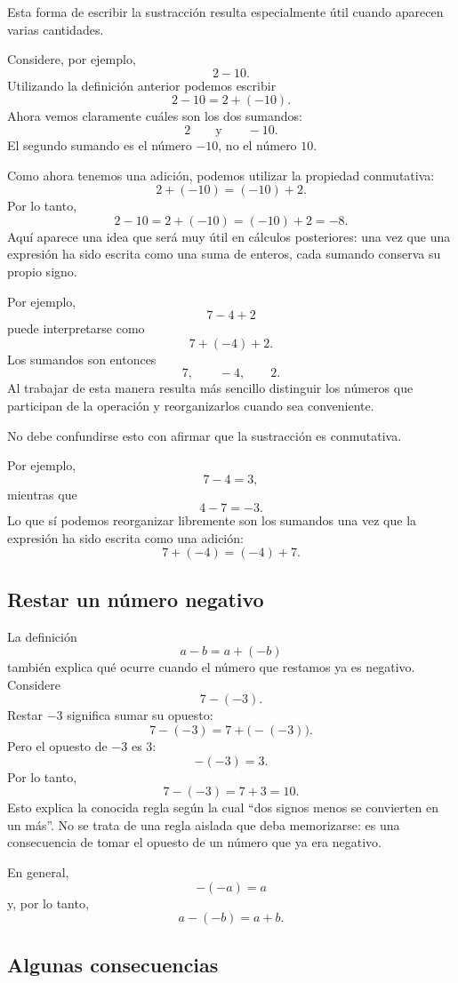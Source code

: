 Esta forma de escribir la sustracción resulta especialmente útil cuando aparecen varias cantidades.

Considere, por ejemplo,
\[
2-10.
\]
Utilizando la definición anterior podemos escribir
\[
2-10=2+(-10).
\]
Ahora vemos claramente cuáles son los dos sumandos:
\[
2
\qquad\text{y}\qquad
-10.
\]
El segundo sumando es el número \(-10\), no el número \(10\).

Como ahora tenemos una adición, podemos utilizar la propiedad conmutativa:
\[
2+(-10)=(-10)+2.
\]
Por lo tanto,
\[
2-10
=
2+(-10)
=
(-10)+2
=
-8.
\]
Aquí aparece una idea que será muy útil en cálculos posteriores: una vez que una expresión ha sido escrita como una suma de enteros, cada sumando conserva su propio signo.

Por ejemplo,
\[
7-4+2
\]
puede interpretarse como
\[
7+(-4)+2.
\]
Los sumandos son entonces
\[
7,\qquad -4,\qquad 2.
\]
Al trabajar de esta manera resulta más sencillo distinguir los números que participan de la operación y reorganizarlos cuando sea conveniente.

\begin{note}
No debe confundirse esto con afirmar que la sustracción es conmutativa.

Por ejemplo,
\[
7-4=3,
\]
mientras que
\[
4-7=-3.
\]
Lo que sí podemos reorganizar libremente son los sumandos una vez que la expresión ha sido escrita como una adición:
\[
7+(-4)=(-4)+7.
\]
\end{note}

\subsection{Restar un número negativo}

La definición
\[
a-b=a+(-b)
\]
también explica qué ocurre cuando el número que restamos ya es negativo.
Considere
\[
7-(-3).
\]
Restar \(-3\) significa sumar su opuesto:
\[
7-(-3)=7+\bigl(-(-3)\bigr).
\]
Pero el opuesto de \(-3\) es \(3\):
\[
-(-3)=3.
\]
Por lo tanto,
\[
7-(-3)=7+3=10.
\]
Esto explica la conocida regla según la cual ``dos signos menos se convierten en un más''. No se trata de una regla aislada que deba memorizarse: es una consecuencia de tomar el opuesto de un número que ya era negativo.

En general,
\[
-(-a)=a
\]
y, por lo tanto,
\[
a-(-b)=a+b.
\]

\subsection{Algunas consecuencias}

